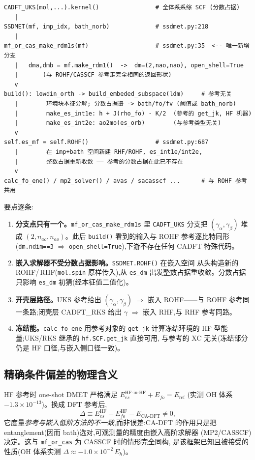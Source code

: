 \documentclass[11pt,a4paper]{ctexart}
\begin{document}
\begin{verbatim}
CADFT_UKS(mol,...).kernel()                # 全体系系综 SCF (分数占据)
   |
SSDMET(mf, imp_idx, bath_norb)             # ssdmet.py:218
   |
mf_or_cas_make_rdm1s(mf)                   # ssdmet.py:35  <-- 唯一新增分支
   |   dma,dmb = mf.make_rdm1()  ->  dm=(2,nao,nao), open_shell=True
   |       (与 ROHF/CASSCF 参考走完全相同的返回形状)
   v
build(): lowdin_orth -> build_embeded_subspace(ldm)     # 参考无关
   |        环境块本征分解; 分数占据谱 -> bath/fo/fv (阈值或 bath_norb)
   |        make_es_int1e: h + J(rho_fo) - K/2  (参考的 get_jk, HF 机器)
   |        make_es_int2e: ao2mo(es_orb)        (与参考类型无关)
   v
self.es_mf = self.ROHF()                   # ssdmet.py:687
   |        在 imp+bath 空间新建 RHF/ROHF, es_int1e/int2e,
   |        整数占据重新收敛 —— 参考的分数占据在此已不存在
   v
calc_fo_ene() / mp2_solver() / avas / sacasscf ...      # 与 ROHF 参考共用
\end{verbatim}

要点逐条:

\begin{enumerate}
\item \textbf{分支点只有一个。}\texttt{mf\_or\_cas\_make\_rdm1s} 里
\texttt{CADFT\_UKS} 分支把 $(\gamma_\alpha,\gamma_\beta)$ 堆成
$(2,n_{ao},n_{ao})$。此后 \texttt{build()} 看到的输入与 ROHF 参考逐比特同形
(\texttt{dm.ndim==3} $\Rightarrow$ \texttt{open\_shell=True}),下游不存在任何
CADFT 特殊代码。
\item \textbf{嵌入求解器不受分数占据影响。}\texttt{SSDMET.ROHF()} 在嵌入空间
从头构造新的 ROHF/\,RHF(\texttt{mol.spin} 原样传入),从 \texttt{es\_dm}
出发整数占据重收敛。分数占据只影响 \texttt{es\_dm} 初猜(经本征值二值化)。
\item \textbf{开壳层路径。}UKS 参考给出 $(\gamma_\alpha,\gamma_\beta)$
$\Rightarrow$ 嵌入 ROHF——与 ROHF 参考同一条路;闭壳层 CADFT\_RKS 给出
$\gamma$ $\Rightarrow$ 嵌入 RHF,与 RHF 参考同路。
\item \textbf{冻结能。}\texttt{calc\_fo\_ene} 用参考对象的 \texttt{get\_jk}
计算冻结环境的 HF 型能量;UKS/RKS 继承的 \texttt{hf.SCF.get\_jk} 直接可用,
与参考的 XC 无关(冻结部分仍是 HF 口径,与嵌入侧口径一致)。
\end{enumerate}

\subsection{精确条件偏差的物理含义}

HF 参考时 one-shot DMET 严格满足
$E_{es}^{\mathrm{HF\text{-}in\text{-}HF}} + E_{fo} = E_{\mathrm{ref}}$
(实测 OH 体系 $-1.3\times10^{-13}$)。换成 DFT 参考后,
\begin{equation}
  \Delta \equiv E_{es}^{\mathrm{HF}} + E_{fo}^{\mathrm{HF}} - E_{\mathrm{CA\text{-}DFT}}
  \neq 0 ,
\end{equation}
它度量\emph{参考与嵌入低阶方法的不一致},而非误差:CA-DFT 的作用只是把
entanglement(因而 bath)选对,可观测量的精度由嵌入高阶求解器
(MP2/CASSCF)决定。这与 \texttt{mf\_or\_cas} 为 CASSCF 时的情形完全同构,
是该框架已知且被接受的性质(OH 体系实测 $\Delta \approx -1.0\times10^{-2}\,E_h$)。
\end{document}
